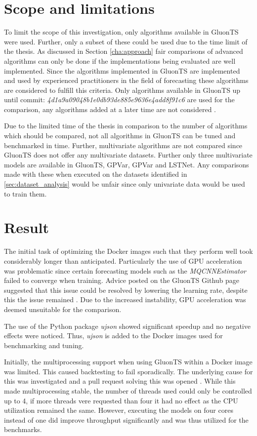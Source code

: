 \section{Scope and limitations}
To limit the scope of this investigation, only algorithms available in GluonTS were used. Further, only a subset of these could be used due to the time limit of the thesis. As discussed in Section \ref{cha:approach} fair comparisons of advanced algorithms can only be done if the implementations being evaluated are well implemented. Since the algorithms implemented in GluonTS are implemented and used by experienced practitioners in the field of forecasting these algorithms are considered to fulfill this criteria. Only algorithms available in GluonTS up until commit: \textit{4d1a9a09048b1e0db93de885e9636e4add8f91c6} are used for the comparison, any algorithms added at a later time are not considered \cite{gluonts-github}.

Due to the limited time of the thesis in comparison to the number of algorithms which should be compared, not all algorithms in GluonTS can be tuned and benchmarked in time. Further, multivariate algorithms are not compared since GluonTS does not offer any multivariate datasets. Further only three multivariate models are available in GluonTS, GPVar, GPVar and LSTNet. Any comparisons made with these when executed on the datasets identified in \ref{sec:dataset_analysis} would be unfair since only univariate data would be used to train them.

\section{Result}
The initial task of optimizing the Docker images such that they perform well took considerably longer than anticipated. Particularly the use of GPU acceleration was problematic since certain forecasting models such as the \textit{MQCNNEstimator} failed to converge when training. Advice posted on the GluonTS Github page suggested that this issue could be resolved by lowering the learning rate, despite this the issue remained \cite{gluonts-github}. Due to the increased instability, GPU acceleration was deemed unsuitable for the comparison.

The use of the Python package \textit{ujson} showed significant speedup and no negative effects were noticed. Thus, \textit{ujson} is added to the Docker images used for benchmarking and tuning.

Initially, the multiprocessing support when using GluonTS within a Docker image was limited. This caused backtesting to fail sporadically. The underlying cause for this was investigated and a pull request solving this was opened \cite{fix_dockerfile_pr}. While this made multiprocessing stable, the number of threads used could only be controlled up to 4, if more threads vere requested than four it had no effect as the CPU utilization remained the same. However, executing the models on four cores instead of one did improve throughput significantly and was thus utilized for the benchmarks.

